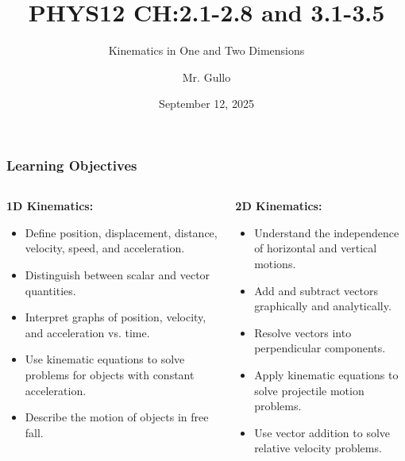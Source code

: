 \documentclass{beamer}
\title[Short Title]{PHYS12 CH:2.1-2.8 and 3.1-3.5}
\subtitle{Kinematics in One and Two Dimensions}
\author[Mr. Gullo]{Mr. Gullo}
\date[Sep 12, 2025]{September 12, 2025}
\begin{document}
\frame{\titlepage}

\begin{frame}
\frametitle{Learning Objectives}
\begin{columns}[T]
    \begin{column}{0.5\textwidth}
        \textbf{1D Kinematics:}
        \begin{itemize}
            \item Define position, displacement, distance, velocity, speed, and acceleration.
            \item Distinguish between scalar and vector quantities.
            \item Interpret graphs of position, velocity, and acceleration vs. time.
            \item Use kinematic equations to solve problems for objects with constant acceleration.
            \item Describe the motion of objects in free fall.
        \end{itemize}
    \end{column}
    \begin{column}{0.5\textwidth}
        \textbf{2D Kinematics:}
        \begin{itemize}
            \item Understand the independence of horizontal and vertical motions.
            \item Add and subtract vectors graphically and analytically.
            \item Resolve vectors into perpendicular components.
            \item Apply kinematic equations to solve projectile motion problems.
            \item Use vector addition to solve relative velocity problems.
        \end{itemize}
    \end{column}
\end{columns}
\end{frame}
\end{document}
